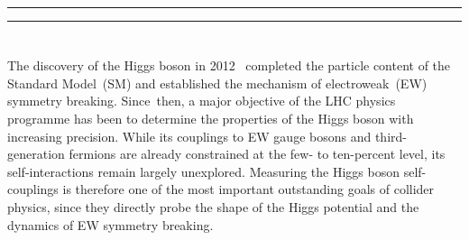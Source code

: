 \documentclass{SciPost}
\providecommand{\DIFaddtex}[1]{{\protect\color{red} #1}} %
\providecommand{\DIFaddbegin}{} %
\providecommand{\DIFaddend}{} %
\providecommand{\DIFadd}[1]{\texorpdfstring{\DIFaddtex{#1}}{#1}} %
\begin{document}
\noindent\textcolor{white!90!black}{%
}




\newpage

\vspace{10pt}
\noindent\rule{\textwidth}{1pt}
\tableofcontents
\noindent\rule{\textwidth}{1pt}
\vspace{10pt}

\allowdisplaybreaks

\section{\textbf{}}
\label{sec:introduction}

The discovery of the Higgs boson in 2012~\cite{ATLAS:2012yve,CMS:2012qbp} completed the particle content of the Standard Model~(SM) and established the mechanism of electroweak~(EW) symmetry breaking. Since~then, a major objective of the LHC physics programme has been to determine the properties of the Higgs boson with increasing precision. While its couplings to EW gauge bosons and third-generation fermions are already constrained at the few- to ten-percent level, its self-interactions remain largely unexplored. Measuring the Higgs \DIFaddbegin \DIFadd{boson }\DIFaddend self-couplings is therefore one of the most important outstanding goals of collider physics, since they directly probe the shape of the Higgs potential and the dynamics of EW symmetry breaking.
\end{document}
